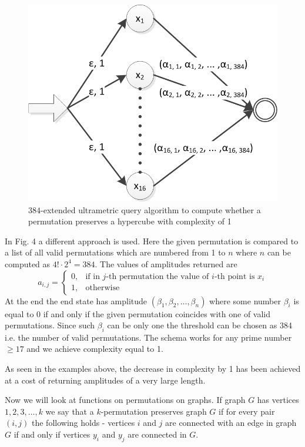 \documentclass{llncs}
\begin{document}
\begin{figure}
	\centering
	\includegraphics{hypercube_1block.png}
	\caption{$384$-extended ultrametric query algorithm to compute whether a permutation preserves a hypercube with complexity of 1}
	  \label{hyper1}
\end{figure}

In Fig. 4 a different approach is used. Here the given permutation is compared to a list of all valid permutations which are numbered from 1 to $n$ where $n$ can be computed as $4! \cdot 2^4 = 384$. The values of amplitudes returned are
$$a_{i,j}=\begin{cases}
0, & \text{if in $j$-th permutation the value of $i$-th point is $x_i$} \\
1, & \text{otherwise}
\end{cases}$$
At the end the end state has amplitude $(\beta_1,\beta_2,\dots,\beta_n)$ where some number $\beta_i$ is equal to 0 if and only if the given permutation coincides with one of valid permutations. Since such $\beta_i$ can be only one the threshold can be chosen as 384 i.e. the number of valid permutations. The schema works for any prime number $\geq 17$ and we achieve complexity equal to 1.

As seen in the examples above, the decrease in complexity by 1 has been achieved at a cost of returning amplitudes of a very large length.

Now we will look at functions on permutations on graphs. If graph $G$ has vertices $1,2,3,\dots,k$ we say that a $k$-permutation preserves graph $G$ if for every pair $(i,j)$ the following holds - vertices $i$ and $j$ are connected with an edge in graph $G$ if and only if vertices $y_i$ and $y_j$ are connected in $G$.
\end{document}
